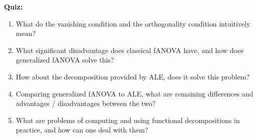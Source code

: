 \textbf{Quiz:}
\begin{enumerate}
    
    \item 
    What do the vanishing condition and the orthogonality condition intuitively mean?
    
    \item
    What significant disadvantage does classical fANOVA have, and how does generalized fANOVA solve this?
    
    \item
    How about the decomposition provided by ALE, does it solve this problem?
    
    \item
    Comparing generalized fANOVA to ALE, what are remaining differences and advantages / disadvantages between the two?

    \item
    What are problems of computing and using functional decompositions in practice, and how can one deal with them?

\end{enumerate}